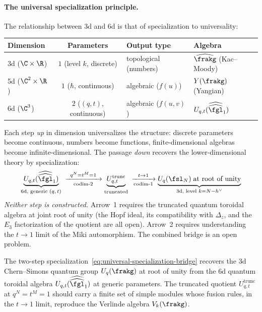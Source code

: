 \paragraph{The universal specialization principle.}
The relationship between 3d and 6d is that of specialization to universality:
\begin{center}
\renewcommand{\arraystretch}{1.3}
\small
\begin{tabular}{lcll}
 \toprule
 \textbf{Dimension} & \textbf{Parameters} & \textbf{Output type} & \textbf{Algebra} \\
 \midrule
 3d ($\C \times \R$) & $1$ (level $k$, discrete) & topological (numbers) & $\widehat{\frakg}$ (Kac--Moody) \\
 5d ($\C^2 \times \R$) & $1$ ($\hbar$, continuous) & algebraic ($f(u)$) & $Y(\frakg)$ (Yangian) \\
 6d ($\C^3$) & $2$ ($(q,t)$, continuous) & algebraic ($f(u,v)$) & $U_{q,t}(\widehat{\widehat{\fgl}}_1)$ \\
 \bottomrule
\end{tabular}
\end{center}
Each step \emph{up} in dimension universalizes the structure: discrete parameters become continuous, numbers become functions, finite-dimensional algebras become infinite-dimensional. The passage \emph{down} recovers the lower-dimensional theory by specialization:
\begin{equation}\label{eq:universal-specialization-bridge}
 \underbrace{U_{q,t}(\widehat{\widehat{\fgl}}_1)}_{\text{6d, generic $(q,t)$}}
 \;\xrightarrow[\text{codim-$2$}]{\;\;q^N = t^M = 1\;\;}
 \underbrace{U_{q,t}^{\mathrm{trunc}}}_{\text{truncated}}
 \;\xrightarrow[\text{codim-$1$}]{\;\;t \to 1\;\;}
 \underbrace{U_q(\fsl_N)\;\text{at root of unity}}_{\text{3d, level }k = N - h^\vee}
\end{equation}
\emph{Neither step is constructed.} Arrow~1 requires the truncated quantum toroidal algebra at joint root of unity (the Hopf ideal, its compatibility with $\Delta_z$, and the $E_3$ factorization of the quotient are all open). Arrow~2 requires understanding the $t \to 1$ limit of the Miki automorphism. The combined bridge is an open problem.

\begin{conjecture}
\label{conj:root-of-unity-bridge}
\ClaimStatusConjectured
The two-step specialization~\eqref{eq:universal-specialization-bridge} recovers the 3d Chern--Simons quantum group $U_q(\frakg)$ at root of unity from the 6d quantum toroidal algebra $U_{q,t}(\widehat{\widehat{\fgl}}_1)$ at generic parameters. The truncated quotient $U_{q,t}^{\mathrm{trunc}}$ at $q^N = t^M = 1$ should carry a finite set of simple modules whose fusion rules, in the $t \to 1$ limit, reproduce the Verlinde algebra $V_k(\frakg)$.
\end{conjecture}

